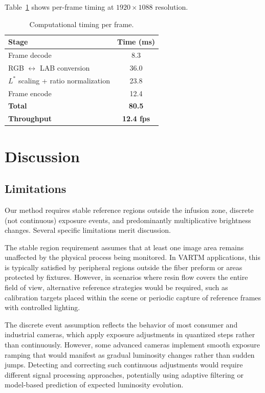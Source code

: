 \documentclass[conference]{IEEEtran}
\begin{document}
Table~\ref{tab:timing} shows per-frame timing at $1920 \times 1088$ resolution.

\begin{table}[t]
\centering
\caption{Computational timing per frame.}
\label{tab:timing}
\begin{tabular}{lc}
\toprule
\textbf{Stage} & \textbf{Time (ms)} \\
\midrule
Frame decode & 8.3 \\
RGB $\leftrightarrow$ LAB conversion & 36.0 \\
$L^*$ scaling + ratio normalization & 23.8 \\
Frame encode & 12.4 \\
\midrule
\textbf{Total} & \textbf{80.5} \\
\textbf{Throughput} & \textbf{12.4 fps} \\
\bottomrule
\end{tabular}
\end{table}

\section{Discussion}

\subsection{Limitations}

Our method requires stable reference regions outside the infusion zone, discrete (not continuous) exposure events, and predominantly multiplicative brightness changes. Several specific limitations merit discussion.

The stable region requirement assumes that at least one image area remains unaffected by the physical process being monitored. In VARTM applications, this is typically satisfied by peripheral regions outside the fiber preform or areas protected by fixtures. However, in scenarios where resin flow covers the entire field of view, alternative reference strategies would be required, such as calibration targets placed within the scene or periodic capture of reference frames with controlled lighting.

The discrete event assumption reflects the behavior of most consumer and industrial cameras, which apply exposure adjustments in quantized steps rather than continuously. However, some advanced cameras implement smooth exposure ramping that would manifest as gradual luminosity changes rather than sudden jumps. Detecting and correcting such continuous adjustments would require different signal processing approaches, potentially using adaptive filtering or model-based prediction of expected luminosity evolution.
\end{document}
